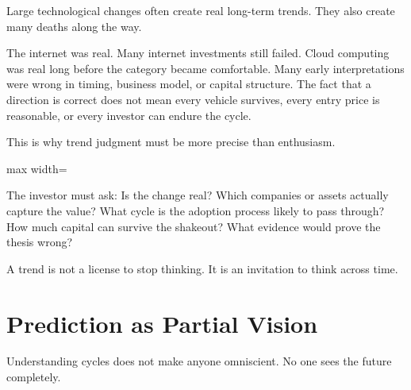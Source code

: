 Large technological changes often create real long-term trends. They also create many deaths along the way.

The internet was real. Many internet investments still failed. Cloud computing was real long before the category became comfortable. Many early interpretations were wrong in timing, business model, or capital structure. The fact that a direction is correct does not mean every vehicle survives, every entry price is reasonable, or every investor can endure the cycle.

This is why trend judgment must be more precise than enthusiasm.

\begin{center}
\begin{adjustbox}{max width=\linewidth}
\end{adjustbox}
\end{center}

The investor must ask: Is the change real? Which companies or assets actually capture the value? What cycle is the adoption process likely to pass through? How much capital can survive the shakeout? What evidence would prove the thesis wrong?

A trend is not a license to stop thinking. It is an invitation to think across time.

\section*{Prediction as Partial Vision}

Understanding cycles does not make anyone omniscient. No one sees the future completely.


